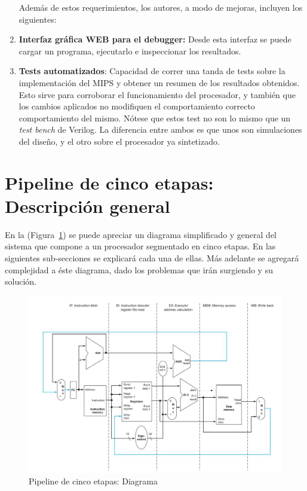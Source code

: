 \documentclass[12pt]{article}
\begin{document}
\begin{enumerate}
      Además de estos requerimientos, los autores, a modo de mejoras, incluyen los siguientes: \\

      \item \textbf{Interfaz gráfica WEB para el debugger:} Desde esta interfaz se puede cargar un programa, ejecutarlo e inspeccionar los resultados.
      \item \textbf{Tests automatizados}: Capacidad de correr una tanda de tests sobre la implementación del MIPS y obtener un resumen de los resultados obtenidos. Esto sirve para corroborar el funcionamiento del procesador, y también que los cambios aplicados no modifiquen el comportamiento correcto comportamiento del mismo. Nótese que estos test no son lo mismo que un \textit{test bench} de Verilog. La diferencia entre ambos es que unos son simulaciones del diseño, y el otro sobre el procesador ya sintetizado.
\end{enumerate}

\section{Pipeline de cinco etapas: Descripción general}

En la (Figura~\ref{fig:pipeline}) se puede apreciar un diagrama simplificado y general del sistema que compone a un procesador segmentado en cinco etapas. En las siguientes sub-secciones se explicará cada una de ellas. Más adelante se agregará complejidad a éste diagrama, dado los problemas que irán surgiendo y su solución.

\begin{figure}[ht]
\centering
\hspace*{-1cm}
\includegraphics[width=1.1\textwidth]{imagenes/esquema_pipeline.jpeg}
\caption{Pipeline de cinco etapas: Diagrama \cite{patterson}}
\label{fig:pipeline}
\end{figure}
\end{document}
